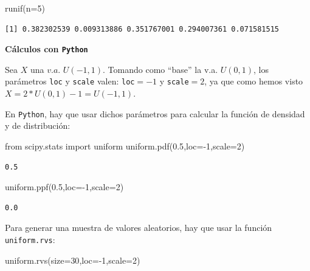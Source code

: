 \documentclass[
  letterpaper,
  DIV=11,
  numbers=noendperiod]{scrreprt}
\newenvironment{Shaded}{\begin{snugshade}}{\end{snugshade}}
\newcommand{\AttributeTok}[1]{\textcolor[rgb]{0.40,0.45,0.13}{#1}}
\newcommand{\DecValTok}[1]{\textcolor[rgb]{0.68,0.00,0.00}{#1}}
\newcommand{\FloatTok}[1]{\textcolor[rgb]{0.68,0.00,0.00}{#1}}
\newcommand{\FunctionTok}[1]{\textcolor[rgb]{0.28,0.35,0.67}{#1}}
\newcommand{\ImportTok}[1]{\textcolor[rgb]{0.00,0.46,0.62}{#1}}
\newcommand{\NormalTok}[1]{\textcolor[rgb]{0.00,0.23,0.31}{#1}}
\newcommand{\OperatorTok}[1]{\textcolor[rgb]{0.37,0.37,0.37}{#1}}
\begin{document}
\begin{Shaded}
\begin{Highlighting}[]
\FunctionTok{runif}\NormalTok{(}\AttributeTok{n=}\DecValTok{5}\NormalTok{)}
\end{Highlighting}
\end{Shaded}

\begin{verbatim}
[1] 0.382302539 0.009313886 0.351767001 0.294007361 0.071581515
\end{verbatim}

\textbf{Cálculos con \texttt{Python}}

Sea \(X\) una \(v.a.\) \(U(-1,1)\). Tomando como ``base'' la v.a.
\(U(0,1)\), los parámetros \texttt{loc} y \texttt{scale} valen:
\texttt{loc}\(=-1\) y \texttt{scale}\(=2\), ya que como hemos visto
\(X=2*U(0,1)-1=U(-1,1)\).

En \texttt{Python}, hay que usar dichos parámetros para calcular la
función de densidad y de distribución:

\begin{Shaded}
\begin{Highlighting}[]
\ImportTok{from}\NormalTok{ scipy.stats }\ImportTok{import}\NormalTok{ uniform}
\NormalTok{uniform.pdf(}\FloatTok{0.5}\NormalTok{,loc}\OperatorTok{={-}}\DecValTok{1}\NormalTok{,scale}\OperatorTok{=}\DecValTok{2}\NormalTok{)}
\end{Highlighting}
\end{Shaded}

\begin{verbatim}
0.5
\end{verbatim}

\begin{Shaded}
\begin{Highlighting}[]
\NormalTok{uniform.ppf(}\FloatTok{0.5}\NormalTok{,loc}\OperatorTok{={-}}\DecValTok{1}\NormalTok{,scale}\OperatorTok{=}\DecValTok{2}\NormalTok{)}
\end{Highlighting}
\end{Shaded}

\begin{verbatim}
0.0
\end{verbatim}

Para generar una muestra de valores aleatorios, hay que usar la función
\texttt{uniform.rvs}:

\begin{Shaded}
\begin{Highlighting}[]
\NormalTok{uniform.rvs(size}\OperatorTok{=}\DecValTok{30}\NormalTok{,loc}\OperatorTok{={-}}\DecValTok{1}\NormalTok{,scale}\OperatorTok{=}\DecValTok{2}\NormalTok{)}
\end{Highlighting}
\end{Shaded}
\end{document}
